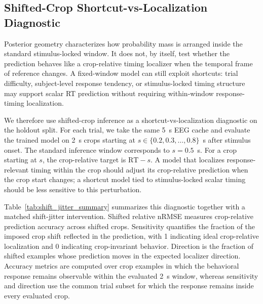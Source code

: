 \documentclass[12pt]{article}
\begin{document}
\subsection{Shifted-Crop Shortcut-vs-Localization Diagnostic}

Posterior geometry characterizes how probability mass is arranged inside the standard stimulus-locked window. It does not, by itself, test whether the prediction behaves like a crop-relative timing localizer when the temporal frame of reference changes. A fixed-window model can still exploit shortcuts: trial difficulty, subject-level response tendency, or stimulus-locked timing structure may support scalar RT prediction without requiring within-window response-timing localization.

We therefore use shifted-crop inference as a shortcut-vs-localization diagnostic on the holdout split. For each trial, we take the same 5~s EEG cache and evaluate the trained model on 2~s crops starting at $s\in\{0.2,0.3,\dots,0.8\}$~s after stimulus onset. The standard inference window corresponds to $s=0.5$~s. For a crop starting at $s$, the crop-relative target is $\mathrm{RT}-s$. A model that localizes response-relevant timing within the crop should adjust its crop-relative prediction when the crop start changes; a shortcut model tied to stimulus-locked scalar timing should be less sensitive to this perturbation.

Table~\ref{tab:shift_jitter_summary} summarizes this diagnostic together with a matched shift-jitter intervention. Shifted relative nRMSE measures crop-relative prediction accuracy across shifted crops. Sensitivity quantifies the fraction of the imposed crop shift reflected in the prediction, with 1 indicating ideal crop-relative localization and 0 indicating crop-invariant behavior. Direction is the fraction of shifted examples whose prediction moves in the expected localizer direction. Accuracy metrics are computed over crop examples in which the behavioral response remains observable within the evaluated 2~s window, whereas sensitivity and direction use the common trial subset for which the response remains inside every evaluated crop.
\end{document}
